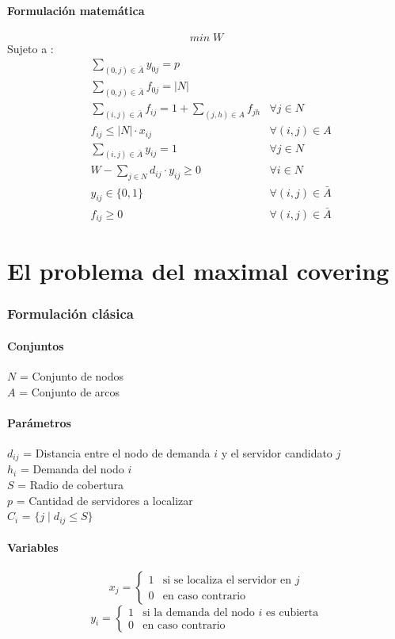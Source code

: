 \documentclass{article}
\numberwithin{equation}{section}
\begin{document}
\subsection{Formulación matemática}
\begin{equation}
min \; W
\end{equation}
Sujeto a : \begin{align}
& \sum_{(0,j) \in \bar{A}} y_{0j} = p \\
& \sum_{(0,j) \in \bar{A}} f_{0j} = |N|\\
& \sum_{(i,j) \in \bar{A}} f_{ij} = 1 + \sum_{(j,h) \in A} f_{jh} &\forall j \in N \\
& f_{ij} \leq |N| \cdot x_{ij} &\forall (i,j) \in A\\
& \sum_{(i,j) \in \bar{A}} y_{ij} = 1 &\forall j \in N \\
& W - \sum_{j \in N} d_{ij} \cdot y_{ij} \geq 0 &\forall i \in N\\
& y_{ij} \in \{0,1\} &\forall (i,j) \in \bar{A}\\
& f_{ij} \geq 0 &\forall (i,j) \in \bar{A}
\end{align}


\newpage
\part{El problema del maximal covering}
\section{Formulación clásica}
\subsection{Conjuntos}
$N$ = Conjunto de nodos\\
$A$ = Conjunto de arcos
\subsection{Parámetros}
$d_{ij}$ = Distancia entre el nodo de demanda $i$ y el servidor candidato $j$\\
$h_{i}$ = Demanda del nodo $i$\\
$S$ = Radio de cobertura\\
$p$ = Cantidad de servidores a localizar\\
$C_{i}$ = $\{j \mid d_{ij} \leq S\}$
\subsection{Variables}
\begin{flushleft}
\[x_{j}={\begin{cases}1&{\mbox{si se localiza el servidor en $j$}}\\0&{\mbox{en caso contrario}}\end{cases}}
\]
\[y_{i}={\begin{cases}1&{\mbox{si la demanda del nodo $i$ es cubierta}}\\0&{\mbox{en caso contrario}}\end{cases}}
\]
\end{flushleft}
\end{document}
